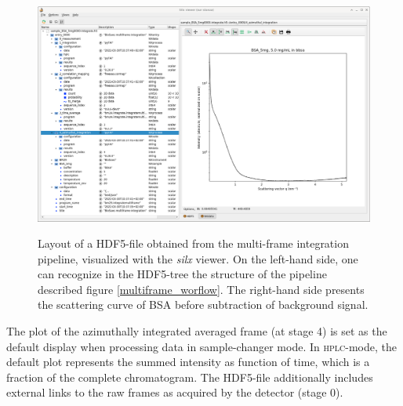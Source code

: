 \documentclass[preprint]{iucr}              %
\begin{document}
\begin{figure}
     \caption{Layout of a HDF5-file obtained from the multi-frame integration pipeline, visualized with the \textit{silx} viewer.
     On the left-hand side, one can recognize in the HDF5-tree the structure of the pipeline described figure \ref{multiframe_worflow}.
     The right-hand side presents the scattering curve of BSA before subtraction of background signal.}
     \includegraphics[width=12cm]{multiframe.eps}
     \label{multiframe}
\end{figure}

The plot of the azimuthally integrated averaged frame (at stage 4) is set as the default display  when processing data in sample-changer mode.
In \textsc{hplc}-mode, the default plot represents the summed intensity as function of time, which is a fraction of the complete chromatogram. 
The HDF5-file additionally includes external links to the raw frames as acquired by the detector (stage 0).
\end{document}
